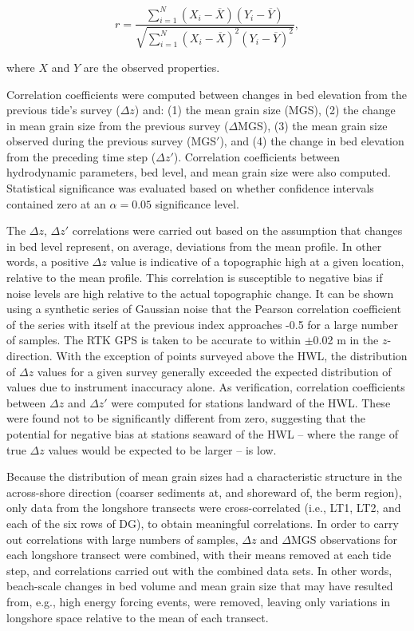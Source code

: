 \begin{equation}\label{eq:pearsons_r}
r = \frac{\sum_{i=1}^{N}(X_i-\overline{X})(Y_i-\overline{Y})}{\sqrt{\sum_{i=1}^{N}(X_i-\overline{X})^2 (Y_i-\overline{Y})^2}},
\end{equation}

\noindent where $X$ and $Y$ are the observed properties.

Correlation coefficients were computed between changes in bed elevation from the previous tide's survey ($\Delta z$) and: (1) the mean grain size (MGS), (2) the change in mean grain size from the previous survey ($\Delta$MGS), (3) the mean grain size observed during the previous survey (MGS$'$), and (4) the change in bed elevation from the preceding time step ($\Delta z'$). Correlation coefficients between hydrodynamic parameters, bed level, and mean grain size were also computed. Statistical significance was evaluated based on whether confidence intervals contained zero at an $\alpha=0.05$ significance level.

The $\Delta z$, $\Delta z'$ correlations were carried out based on the assumption that changes in bed level represent, on average, deviations from the mean profile. In other words, a positive $\Delta z$ value is indicative of a topographic high at a given location, relative to the mean profile. This correlation is susceptible to negative bias if noise levels are high relative to the actual topographic change. It can be shown using a synthetic series of Gaussian noise that the Pearson correlation coefficient of the series with itself at the previous index approaches -0.5 for a large number of samples. The RTK GPS is taken to be accurate to within $\pm$0.02 m in the $z$-direction. With the exception of points surveyed above the HWL, the distribution of $\Delta z$ values for a given survey generally exceeded the expected distribution of values due to instrument inaccuracy alone. As verification, correlation coefficients between $\Delta z$ and $\Delta z'$ were computed for stations landward of the HWL. These were found not to be significantly different from zero, suggesting that the potential for negative bias at stations seaward of the HWL -- where the range of true $\Delta z$ values would be expected to be larger -- is low.

Because the distribution of mean grain sizes had a characteristic structure in the across-shore direction (coarser sediments at, and shoreward of, the berm region), only data from the longshore transects were cross-correlated (i.e., LT1, LT2, and each of the six rows of DG), to obtain meaningful correlations. In order to carry out correlations with large numbers of samples, $\Delta z$ and $\Delta$MGS observations for each longshore transect were combined, with their means removed at each tide step, and correlations carried out with the combined data sets. In other words, beach-scale changes in bed volume and mean grain size that may have resulted from, e.g., high energy forcing events, were removed, leaving only variations in longshore space relative to the mean of each transect.

